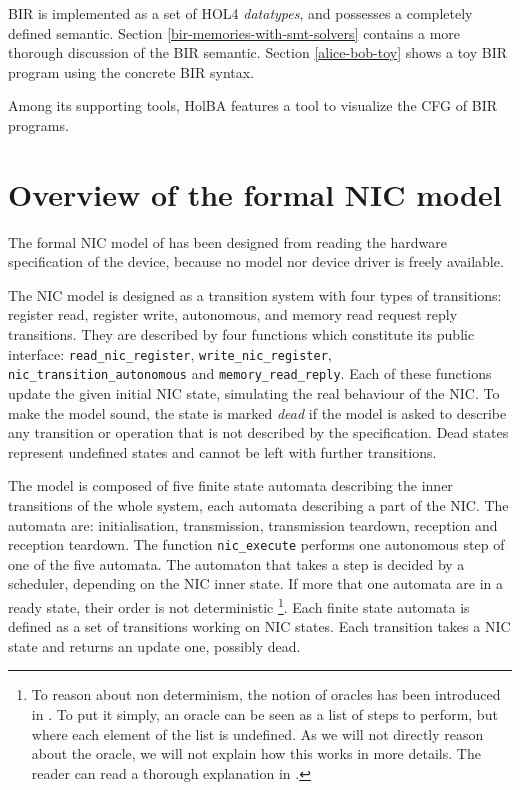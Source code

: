 \documentclass{kththesis}
\begin{document}
BIR is implemented as a set of HOL4 \textit{datatypes}, and possesses a completely defined semantic. Section \ref{bir-memories-with-smt-solvers} contains a more thorough discussion of the BIR semantic. Section \ref{alice-bob-toy} shows a toy BIR program using the concrete BIR syntax.

Among its supporting tools, HolBA features a tool to visualize the \gls{CFG} of BIR programs.

\section{Overview of the formal NIC model} \label{overview-nic-model}

The formal NIC model of \cite{haglund_formal_2016} has been designed from reading the hardware specification of the device, because no model nor device driver is freely available.

The NIC model is designed as a transition system with four types of transitions: register read, register write, autonomous, and memory read request reply transitions. They are described by four functions which constitute its public interface: \texttt{read\_nic\_register}, \texttt{write\_nic\_register}, \texttt{nic\_transition\_autonomous} and \texttt{memory\_read\_reply}. Each of these functions update the given initial NIC state, simulating the real behaviour of the NIC. To make the model sound, the state is marked \textit{dead} if the model is asked to describe any transition or operation that is not described by the specification. Dead states represent undefined states and cannot be left with further transitions.

The model is composed of five finite state automata describing the inner transitions of the whole system, each automata describing a part of the NIC. The automata are: initialisation, transmission, transmission teardown, reception and reception teardown. The function \texttt{nic\_execute} performs one autonomous step of one of the five automata. The automaton that takes a step is decided by a scheduler, depending on the NIC inner state. If more that one automata are in a ready state, their order is not deterministic \footnote{To reason about non determinism, the notion of oracles has been introduced in \cite{haglund_formal_2016}. To put it simply, an oracle can be seen as a list of steps to perform, but where each element of the list is undefined. As we will not directly reason about the oracle, we will not explain how this works in more details. The reader can read a thorough explanation in \cite{haglund_formal_2016}.}. Each finite state automata is defined as a set of transitions working on NIC states. Each transition takes a NIC state and returns an update one, possibly dead.
\end{document}
